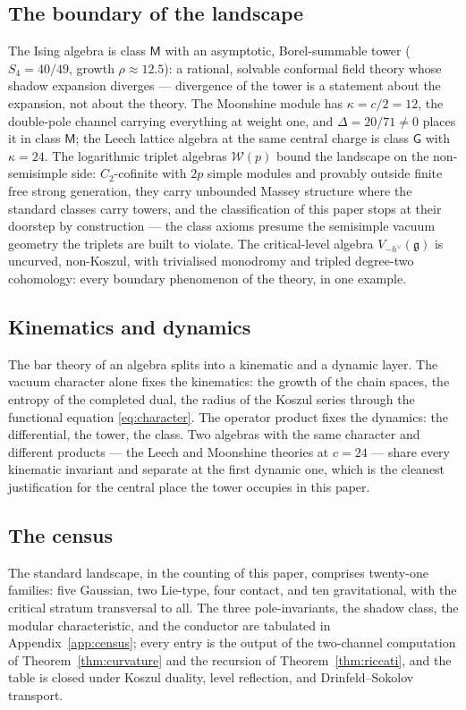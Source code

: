 \documentclass[11pt]{amsart}
\numberwithin{equation}{section}
\theoremstyle{plain}
\theoremstyle{definition}
\theoremstyle{remark}
\newcommand{\cW}{\mathcal{W}}
\newcommand{\fg}{\mathfrak{g}}
\newcommand{\dvee}{h^{\vee}}
\begin{document}
\subsection{The boundary of the landscape}

The Ising algebra is class $\mathsf{M}$ with an asymptotic,
Borel-summable tower ($S_4=40/49$, growth $\rho\approx12.5$): a
rational, solvable conformal field theory whose shadow expansion
diverges --- divergence of the tower is a statement about the
expansion, not about the theory. The Moonshine module has
$\kappa=c/2=12$, the double-pole channel carrying everything at
weight one, and
$\Delta=20/71\neq0$ places it in class $\mathsf{M}$; the Leech lattice
algebra at the same central charge is class $\mathsf{G}$ with
$\kappa=24$. The logarithmic triplet algebras $\cW(p)$ bound the landscape on the
non-semisimple side: $C_2$-cofinite with $2p$ simple modules and
provably outside finite free strong generation, they carry unbounded
Massey structure where the standard classes carry towers, and the
classification of this paper stops at their doorstep by
construction --- the class axioms presume the semisimple vacuum
geometry the triplets are built to violate. The critical-level
algebra $V_{-\dvee}(\fg)$ is uncurved,
non-Koszul, with trivialised monodromy and tripled degree-two
cohomology: every boundary phenomenon of the theory, in one example.

\subsection{Kinematics and dynamics}

The bar theory of an algebra splits into a kinematic and a dynamic
layer. The vacuum character alone fixes the kinematics: the growth of
the chain spaces, the entropy of the completed dual, the radius of the
Koszul series through the functional equation
\eqref{eq:character}. The operator product fixes the dynamics: the
differential, the tower, the class. Two algebras with the same
character and different products --- the Leech and Moonshine theories
at $c=24$ --- share every kinematic invariant and separate at the
first dynamic one, which is the cleanest justification for the
central place the tower occupies in this paper.

\subsection{The census}

The standard landscape, in the counting of this paper, comprises
twenty-one families: five Gaussian, two Lie-type, four contact, and
ten gravitational, with the critical stratum transversal to all. The
three pole-invariants, the shadow class, the modular characteristic,
and the conductor are tabulated in Appendix~\ref{app:census}; every
entry is the output of the two-channel computation of
Theorem~\ref{thm:curvature} and the recursion of
Theorem~\ref{thm:riccati}, and the table is closed under Koszul
duality, level reflection, and Drinfeld--Sokolov transport.
\end{document}
